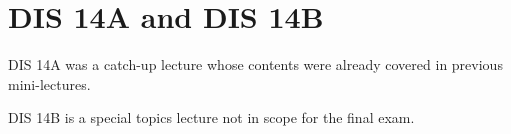 \section{DIS 14A and DIS 14B}
DIS 14A was a catch-up lecture whose contents were already covered in previous mini-lectures.

DIS 14B is a special topics lecture not in scope for the final exam. 